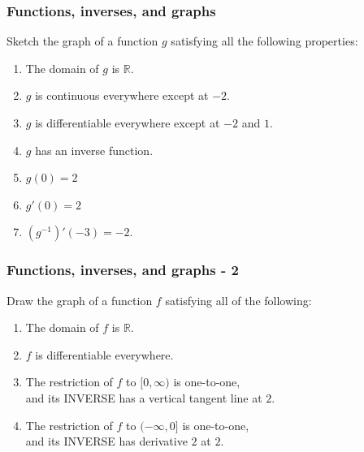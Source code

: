 \documentclass[14pt]{beamer}
\begin{document}
\begin{frame}[t]
	\frametitle{Functions, inverses, and graphs }

	Sketch the graph of a function $g$ satisfying all the following properties:

	\begin{enumerate}
		\item The domain of $g$ is $\mathbb{R}$.

		\item $g$ is continuous everywhere except at $-2$.

		\item $g$ is differentiable everywhere except at $-2$ and $1$.

		\item $g$ has an inverse function.

		\item $g(0)=2$

		\item $g'(0) = 2$

		\item $\displaystyle \left(g^{-1}\right)' (-3) = -2$.
	\end{enumerate}
\end{frame}

\begin{frame}[t]
	\frametitle{Functions, inverses, and graphs - 2}

	Draw the graph of a function $f$ satisfying all of the following:

	\begin{enumerate}
		\item The domain of $f$ is $\mathbb{R}$.

		\item $f$ is differentiable everywhere.

		\item The restriction of $f$ to $\displaystyle [0, \infty)$ is one-to-one,
			\\ and its INVERSE has a vertical tangent line at $2$.

		\item The restriction of $f$ to $\displaystyle (- \infty,0]$ is one-to-one,
			\\ and its INVERSE has derivative $2$ at $2$.
	\end{enumerate}
\end{frame}
\end{document}
